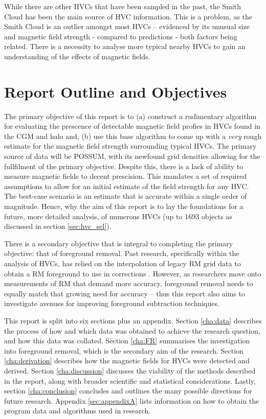 While there are other HVCs that have been sampled in the past, the Smith Cloud has been the main source of HVC information. This is a problem, as the Smith Cloud is an outlier amongst most HVCs – evidenced by its unusual size and magnetic field strength - compared to predictions - both factors being related. There is a necessity to analyse more typical nearby HVCs to gain an understanding of the effects of magnetic fields.

\section{Report Outline and Objectives}
\label{sec:outline}

The primary objective of this report is to (a) construct a rudimentary algorithm for evaluating the prescence of detectable magnetic field profies in HVCs found in the CGM and halo and, (b) use this base algorithm to come up with a \textit{very} rough estimate for the magnetic field strength surrounding typical HVCs. The primary source of data will be POSSUM, with its newfound grid densities allowing for the fullfilment of the primary objective. Despite this, there is a lack of ability to measure magnetic fields to decent prescision. This mandates a set of required assumptions to allow for an initial estimate of the field strength for any HVC. The best-case scenario is an estimate that is accurate within a single order of magnitude. Hence, why the aim of this report is to lay the foundations for a future, more detailed analysis, of numerous HVCs (up to 1693 objects as discussed in section \ref{sec:hvc_sel}).


There is a secondary objective that is integral to completing the primary objective: that of foreground removal. Past research, specifically within the analysis of HVCs, has relied on the interpolation of legacy RM grid data to obtain a RM foreground to use in corrections \citep{ID21, ID26}. However, as researchers move onto measurements of RM that demand more accuracy, foreground removal needs to equally match that growing need for accuracy – thus this report also aims to investigate avenues for improving foreground subtraction techniques.


This report is split into six sections plus an appendix. Section \ref{cha:data} describes the process of how and which data was obtained to achieve the research question, and how this data was collated. Section \ref{cha:FR} summarises the investigation into foreground removal, which is the secondary aim of the research. Section \ref{cha:derivation} describes how the magnetic fields for HVCs were detected and derived. Section \ref{cha:discussion} discusses the viability of the methods described in the report, along with broader scientific and statistical considerations. Lastly, section \ref{cha:conclusion} concludes and outlines the many possible directions for future research. Appendix \ref{sec:appendixA} lists information on how to obtain the program data and algorithms used in research.